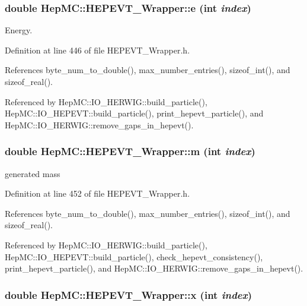 \subsubsection{\setlength{\rightskip}{0pt plus 5cm}double Hep\-MC::HEPEVT\_\-Wrapper::e (int {\em index})\hspace{0.3cm}{\tt  [inline, static]}}\label{classHepMC_1_1HEPEVT__Wrapper_3ed198bf4f4a70fa637e6b93702ea940}


Energy. 



Definition at line 446 of file HEPEVT\_\-Wrapper.h.

References byte\_\-num\_\-to\_\-double(), max\_\-number\_\-entries(), sizeof\_\-int(), and sizeof\_\-real().

Referenced by Hep\-MC::IO\_\-HERWIG::build\_\-particle(), Hep\-MC::IO\_\-HEPEVT::build\_\-particle(), print\_\-hepevt\_\-particle(), and Hep\-MC::IO\_\-HERWIG::remove\_\-gaps\_\-in\_\-hepevt().
\subsubsection{\setlength{\rightskip}{0pt plus 5cm}double Hep\-MC::HEPEVT\_\-Wrapper::m (int {\em index})\hspace{0.3cm}{\tt  [inline, static]}}\label{classHepMC_1_1HEPEVT__Wrapper_162dddfa4b5ef7651341d1b70ea9c843}


generated mass 



Definition at line 452 of file HEPEVT\_\-Wrapper.h.

References byte\_\-num\_\-to\_\-double(), max\_\-number\_\-entries(), sizeof\_\-int(), and sizeof\_\-real().

Referenced by Hep\-MC::IO\_\-HERWIG::build\_\-particle(), Hep\-MC::IO\_\-HEPEVT::build\_\-particle(), check\_\-hepevt\_\-consistency(), print\_\-hepevt\_\-particle(), and Hep\-MC::IO\_\-HERWIG::remove\_\-gaps\_\-in\_\-hepevt().
\subsubsection{\setlength{\rightskip}{0pt plus 5cm}double Hep\-MC::HEPEVT\_\-Wrapper::x (int {\em index})\hspace{0.3cm}{\tt  [inline, static]}}\label{classHepMC_1_1HEPEVT__Wrapper_5e6b99a24d23c6a9ee12eddb3ee6b3f2}


